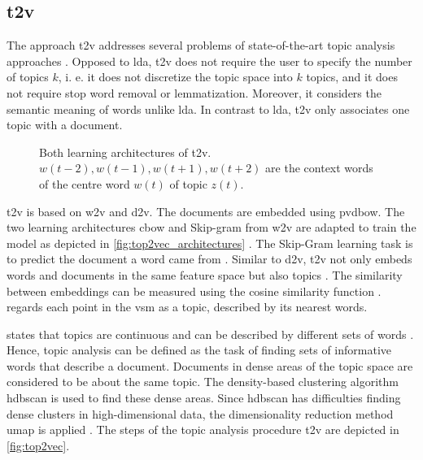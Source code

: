\subsection{\acl*{t2v}}\label{subsec:top2vec}

The approach \ac{t2v} addresses several problems of state-of-the-art topic analysis approaches \cite{Top2Vec2020}.
Opposed to \ac{lda}, \ac{t2v} does not require the user to specify the number of topics $k$, 
i. e. it does not discretize the topic space into $k$ topics, 
and it does not require stop word removal or lemmatization.
Moreover, it considers the semantic meaning of words unlike \ac{lda}.
In contrast to \ac{lda}, \ac{t2v} only associates one topic with a document.

\begin{figure}%
    \centering
    \qquad
    \caption[Two learning architectures of \ac{t2v}]{Both learning architectures of \ac{t2v}.
    $w(t-2), w(t-1), w(t+1), w(t+2)$ are the context words of the centre word $w(t)$ of topic $z(t)$.
    }%
    \label{fig:top2vec_architectures}%
\end{figure}

\ac{t2v} is based on \ac{w2v} and \ac{d2v}.
The documents are embedded using \ac{pvdbow}.
The two learning architectures \ac{cbow} and Skip-gram from \ac{w2v} are adapted to train the model as depicted in \autoref{fig:top2vec_architectures} \cite{Topic2Vec2015}.
The Skip-Gram learning task is to predict the document a word came from \cite{Top2Vec2020, Topic2Vec2015}.
Similar to \ac{d2v}, \ac{t2v} not only embeds words and documents in the same feature space but also topics \cite{Top2Vec2020, Topic2Vec2015}.
The similarity between embeddings can be measured using the cosine similarity function \cite{Topic2Vec2015}.
\citeauthor{Top2Vec2020} regards each point in the \ac{vsm} as a topic, described by its nearest words.

\citeauthor{Top2Vec2020} states that topics are continuous and can be described by different sets of words \cite{Top2Vec2020}.
Hence, topic analysis can be defined as the task of finding sets of informative words that describe a document.
Documents in dense areas of the topic space are considered to be about the same topic.
The density-based clustering algorithm \ac{hdbscan} is used to find these dense areas.
Since \ac{hdbscan} has difficulties finding dense clusters in high-dimensional data, 
the dimensionality reduction method \ac{umap} is applied \cite{Top2Vec2020}.
The steps of the topic analysis procedure \ac{t2v} are depicted in \autoref{fig:top2vec}.


